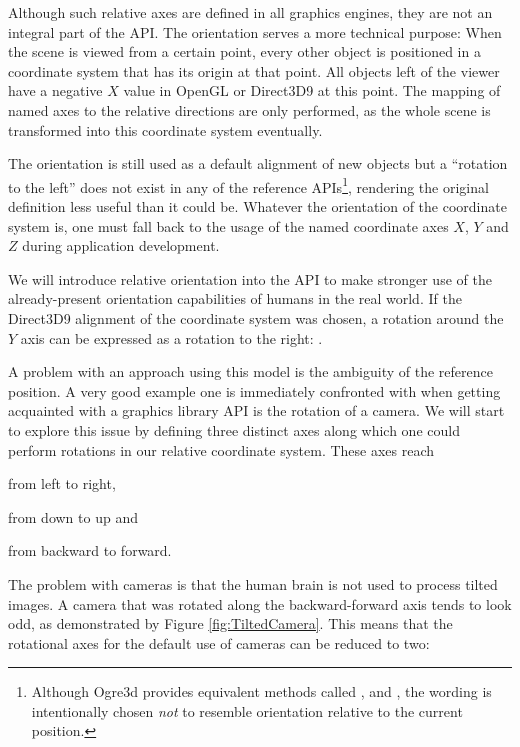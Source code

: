 	Although such relative axes are defined in all graphics engines, they are not an integral part of the API. The orientation serves a more technical purpose: When the scene is viewed from a certain point, every other object is positioned in a coordinate system that has its origin at that point. All objects left of the viewer have a negative $X$ value in OpenGL or Direct3D9 at this point. The mapping of named axes to the relative directions are only performed, as the whole scene is transformed into this coordinate system eventually.

	The orientation is still used as a default alignment of new objects but a ``rotation to the left'' does not exist in any of the reference APIs\footnote{Although Ogre3d provides equivalent methods called ,  and , the wording is intentionally chosen \emph{not} to resemble orientation relative to the current position.}, rendering the original definition less useful than it could be. Whatever the orientation of the coordinate system is, one must fall back to the usage of the named coordinate axes $X$, $Y$ and $Z$ during application development.

	We will introduce relative orientation into the API to make stronger use of the already-present orientation capabilities of humans in the real world. If the Direct3D9 alignment of the coordinate system was chosen, a rotation around the $Y$ axis can be expressed as a rotation to the right: .

	A problem with an approach using this model is the ambiguity of the reference position. A very good example one is immediately confronted with when getting acquainted with a graphics library API is the rotation of a camera. We will start to explore this issue by defining three distinct axes along which one could perform rotations in our relative coordinate system. These axes reach
	
	\begin{smalllist}
		\item from left to right,
		\item from down to up and
		\item from backward to forward.
	\end{smalllist}

	The problem with cameras is that the human brain is not used to process tilted images. A camera that was rotated along the backward-forward axis tends to look odd, as demonstrated by Figure \ref{fig:TiltedCamera}. This means that the rotational axes for the default use of cameras can be reduced to two:
	
